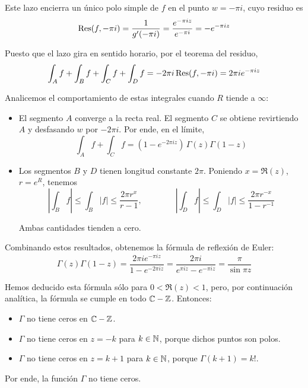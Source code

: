 \begin{solution}
\begin{enumerate}[label=\alph*)]
    Este lazo encierra un único polo simple de $f$ en el punto $w = -\pi i$, cuyo residuo es
    $$\operatorname{Res}(f, -\pi i) = \frac 1 {g'(-\pi i)} = \frac {e^{-\pi iz}} {e^{-\pi i}} = -e^{-\pi iz}$$
    
    Puesto que el lazo gira en sentido horario, por el teorema del residuo,
    $$
    \int_A f + \int_B f + \int_C f + \int_D f
        = -2\pi i \operatorname{Res}(f, -\pi i)
        = 2\pi i e^{-\pi iz}
    $$
    
    Analicemos el comportamiento de estas integrales cuando $R$ tiende a $\infty$:
    
    \begin{itemize}
        \item El segmento $A$ converge a la recta real. El segmento $C$ se obtiene revirtiendo $A$ y desfasando $w$ por $-2\pi i$. Por ende, en el límite,
        $$\int_A f + \int_C f = (1 - e^{-2\pi iz}) \, \Gamma(z) \Gamma(1-z)$$
        
        \item Los segmentos $B$ y $D$ tienen longitud constante $2\pi$. Poniendo $x = \Re(z)$, $r = e^R$, tenemos
        $$
        \left| \int_B f \right| \le \int_B |f| \le \frac {2\pi r^x} {r-1},
        \qquad \qquad
        \left| \int_D f \right| \le \int_D |f| \le \frac {2\pi r^{-x}} {1-r^{-1}}
        $$
        
        Ambas cantidades tienden a cero.
    \end{itemize}
    
    Combinando estos resultados, obtenemos la fórmula de reflexión de Euler:
    $$
    \Gamma(z) \Gamma(1-z)
        = \frac {2\pi ie^{-\pi iz}} {1 - e^{-2\pi iz}}
        = \frac {2\pi i} {e^{\pi iz} - e^{-\pi iz}}
        = \frac \pi {\sin \pi z}
    $$
    
    Hemos deducido esta fórmula sólo para $0 < \Re(z) < 1$, pero, por continuación analítica, la fórmula se cumple en todo $\mathbb C - \mathbb Z$. Entonces:
    \begin{itemize}
        \item $\Gamma$ no tiene ceros en $\mathbb C - \mathbb Z$.
        \item $\Gamma$ no tiene ceros en $z = -k$ para $k \in \mathbb N$, porque dichos puntos son polos.
        \item $\Gamma$ no tiene ceros en $z = k+1$ para $k \in \mathbb N$, porque $\Gamma(k+1) = k!$.
    \end{itemize}
    
    Por ende, la función $\Gamma$ no tiene ceros.
\end{enumerate}
\end{solution}
